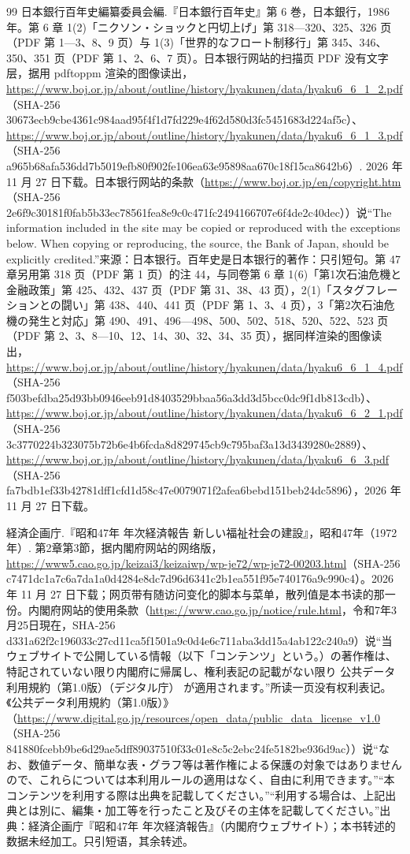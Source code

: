 \begin{thebibliography}{99}
 日本銀行百年史編纂委員会編.『日本銀行百年史』第 6 巻，日本銀行，1986 年。第 6 章 1(2)「ニクソン・ショックと円切上げ」第 318—320、325、326 页（PDF 第 1—3、8、9 页）与 1(3)「世界的なフロート制移行」第 345、346、350、351 页（PDF 第 1、2、6、7 页）。日本银行网站的扫描页 PDF 没有文字层，据用 pdftoppm 渲染的图像读出，\url{https://www.boj.or.jp/about/outline/history/hyakunen/data/hyaku6_6_1_2.pdf}（SHA-256 30673ecb9cbe4361c984aad95f4f1d7fd229e4f62d580d3fc5451683d224af5c）、\url{https://www.boj.or.jp/about/outline/history/hyakunen/data/hyaku6_6_1_3.pdf}（SHA-256 a965b68afa536dd7b5019efb80f902fe106ea63e95898aa670c18f15ca8642b6）. 2026 年 11 月 27 日下载。日本银行网站的条款（\url{https://www.boj.or.jp/en/copyright.htm}（SHA-256 2e6f9c30181f0fab5b33ec78561fea8e9c0c471fc2494166707e6f4de2c40dec））说“The information included in the site may be copied or reproduced with the exceptions below. When copying or reproducing, the source, the Bank of Japan, should be explicitly credited.”来源：日本银行。百年史是日本银行的著作：只引短句。第 47 章另用第 318 页（PDF 第 1 页）的注 44，与同卷第 6 章 1(6)「第1次石油危機と金融政策」第 425、432、437 页（PDF 第 31、38、43 页），2(1)「スタグフレーションとの闘い」第 438、440、441 页（PDF 第 1、3、4 页），3「第2次石油危機の発生と対応」第 490、491、496—498、500、502、518、520、522、523 页（PDF 第 2、3、8—10、12、14、30、32、34、35 页），据同样渲染的图像读出，\url{https://www.boj.or.jp/about/outline/history/hyakunen/data/hyaku6_6_1_4.pdf}（SHA-256 f503befdba25d93bb0946eeb91d8403529bbaa56a3dd3d5bcc0dc9f1db813cdb）、\url{https://www.boj.or.jp/about/outline/history/hyakunen/data/hyaku6_6_2_1.pdf}（SHA-256 3c3770224b323075b72b6e4b6fcda8d829745cb9c795baf3a13d3439280e2889）、\url{https://www.boj.or.jp/about/outline/history/hyakunen/data/hyaku6_6_3.pdf}（SHA-256 fa7bdb1ef33b42781dff1cfd1d58c47e0079071f2afea6bebd151beb24dc5896），2026 年 11 月 27 日下载。

 経済企画庁.『昭和47年 年次経済報告 新しい福祉社会の建設』，昭和47年（1972 年）. 第2章第3節，据内閣府网站的网络版，\url{https://www5.cao.go.jp/keizai3/keizaiwp/wp-je72/wp-je72-00203.html}（SHA-256 c7471dc1a7c6a7da1a0d4284e8dc7d96d6341c2b1ea551f95e740176a9c990c4）。2026 年 11 月 27 日下载；网页带有随访问变化的脚本与菜单，散列值是本书读的那一份。内閣府网站的使用条款（\url{https://www.cao.go.jp/notice/rule.html}，令和7年3月25日現在，SHA-256 d331a62f2c196033c27cd11ca5f1501a9c0d4e6c711aba3dd15a4ab122c240a9）说“当ウェブサイトで公開している情報（以下「コンテンツ」という。）の著作権は、特記されていない限り内閣府に帰属し、権利表記の記載がない限り 公共データ利用規約（第1.0版）（デジタル庁） が適用されます。”所读一页没有权利表记。《公共データ利用規約（第1.0版）》（\url{https://www.digital.go.jp/resources/open_data/public_data_license_v1.0}（SHA-256 841880fcebb9be6d29ae5dff89037510f33c01e8c5c2ebc24fe5182be936d9ac））说“なお、数値データ、簡単な表・グラフ等は著作権による保護の対象ではありませんので、これらについては本利用ルールの適用はなく、自由に利用できます。”“本コンテンツを利用する際は出典を記載してください。”“利用する場合は、上記出典とは別に、編集・加工等を行ったこと及びその主体を記載してください。”出典：経済企画庁『昭和47年 年次経済報告』（内閣府ウェブサイト）；本书转述的数据未经加工。只引短语，其余转述。


\end{thebibliography}
